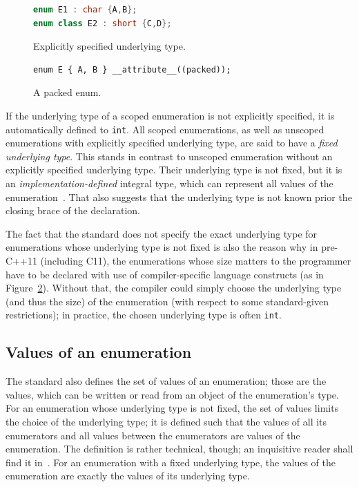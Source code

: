 \documentclass[nolot,nolof,nocover,printed]{fithesis3}
\newcommand{\stdN}[2]{\cite[#2]{#1}\xspace}
\begin{document}
\begin{figure}
\begin{lstlisting}[language=C++]
enum E1 : char {A,B};
enum class E2 : short {C,D};
\end{lstlisting}
\caption{Explicitly specified underlying type.}
\label{fig:explicityleSpecifiedUnderlyingType}
\end{figure}

\begin{figure}
\begin{lstlisting}
enum E { A, B } __attribute__((packed));
\end{lstlisting}
\caption{A packed enum.}
\label{fig:packedEnum}
\end{figure}

If the underlying type of a scoped enumeration is not explicitly specified, it is automatically defined to \texttt{int}. All scoped enumerations, as well as unscoped enumerations with explicitly specified underlying type, are said to have a \textit{fixed underlying type}. This stands in contrast to unscoped enumeration without an explicitly specified underlying type. Their underlying type is not fixed, but it is an \textit{implementation-defined} integral type, which can represent all values of the enumeration~\stdN{n4296}{\S 7.2/7}. That also suggests that the underlying type is not known prior the closing brace of the declaration.

The fact that the standard does not specify the exact underlying type for enumerations whose underlying type is not fixed is also the reason why in pre-C++11 (including C11), the enumerations whose size matters to the programmer have to be declared with use of compiler-specific language constructs (as in Figure~\ref{fig:packedEnum}). Without that, the compiler could simply choose the underlying type (and thus the size) of the enumeration (with respect to some standard-given restrictions); in practice, the chosen underlying type is often \texttt{int}.

\subsection{Values of an enumeration}

The standard also defines the set of values of an enumeration; those are the values, which can be written or read from an object of the enumeration's type. For an enumeration whose underlying type is not fixed, the set of values limits the choice of the underlying type; it is defined such that the values of all its enumerators and all values between the enumerators are values of the enumeration. The definition is rather technical, though; an inquisitive reader shall find it in~\stdN{n4296}{\S 7.2/8}. For an enumeration with a fixed underlying type, the values of the enumeration are exactly the values of its underlying type. 
\end{document}
